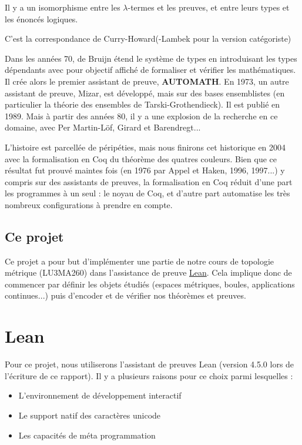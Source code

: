 \documentclass[a4paper, 12pt]{article}
\begin{document}
\begin{center}
    Il y a un isomorphisme entre les $\lambda$-termes et les preuves, et entre leurs types et les énoncés logiques.
\end{center}

C'est la correspondance de Curry-Howard(-Lambek pour la version catégoriste)

Dans les années 70, de Bruijn étend le système de types en introduisant les types dépendants avec pour objectif affiché de formaliser et vérifier les mathématiques. Il crée alors le premier assistant de preuve, \textbf{AUTOMATH}. En 1973, un autre assistant de preuve, Mizar, est développé, mais sur des bases ensemblistes (en particulier la théorie des ensembles de Tarski-Grothendieck). Il est publié en 1989. Mais à partir des années 80, il y a une explosion de la recherche en ce domaine, avec Per Martin-Löf, Girard et Barendregt...

L'histoire est parcellée de péripéties, mais nous finirons cet historique en 2004 avec la formalisation en Coq du théorème des quatres couleurs. Bien que ce résultat fut prouvé maintes fois (en 1976 par Appel et Haken, 1996, 1997...) y compris sur des assistants de preuves, la formalisation en Coq réduit d'une part les programmes à un seul : le noyau de Coq, et d'autre part automatise les très nombreux configurations à prendre en compte.

\subsection{Ce projet}

Ce projet a pour but d'implémenter une partie de notre cours de topologie métrique (LU3MA260) dans l'assistance de preuve \href{https://lean-lang.org/}{Lean}. Cela implique donc de commencer par définir les objets étudiés (espaces métriques, boules, applications continues...) puis d'encoder et de vérifier nos théorèmes et preuves.

\section{Lean}

Pour ce projet, nous utiliserons l'assistant de preuves Lean (version 4.5.0 lors de l'écriture de ce rapport). Il y a plusieurs raisons pour ce choix parmi lesquelles :
\begin{itemize}
    \item L'environnement de développement interactif
    \item Le support natif des caractères unicode
    \item Les capacités de méta programmation
\end{itemize}
\end{document}
